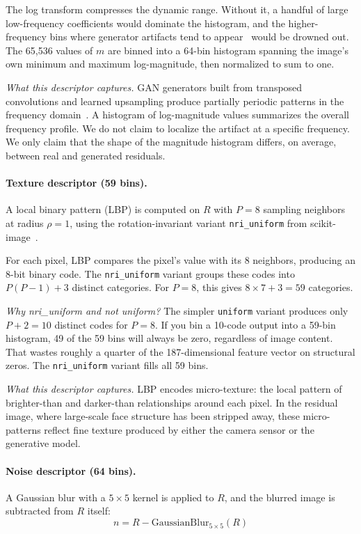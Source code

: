 \documentclass[runningheads]{llncs}
\begin{document}
The log transform compresses the dynamic range. Without it, a handful of large low-frequency coefficients would dominate the histogram, and the higher-frequency bins where generator artifacts tend to appear~\cite{zhang2019} would be drowned out. The 65,536 values of $m$ are binned into a 64-bin histogram spanning the image's own minimum and maximum log-magnitude, then normalized to sum to one.

\textit{What this descriptor captures.} GAN generators built from transposed convolutions and learned upsampling produce partially periodic patterns in the frequency domain~\cite{zhang2019,tan2024}. A histogram of log-magnitude values summarizes the overall frequency profile. We do not claim to localize the artifact at a specific frequency. We only claim that the shape of the magnitude histogram differs, on average, between real and generated residuals.

\paragraph{Texture descriptor (59 bins).} A local binary pattern (LBP) is computed on $R$ with $P = 8$ sampling neighbors at radius $\rho = 1$, using the rotation-invariant variant \texttt{nri\_uniform} from scikit-image~\cite{ojala2002}.

For each pixel, LBP compares the pixel's value with its 8 neighbors, producing an 8-bit binary code. The \texttt{nri\_uniform} variant groups these codes into $P(P-1) + 3$ distinct categories. For $P = 8$, this gives $8 \times 7 + 3 = 59$ categories.

\textit{Why nri\_uniform and not uniform?} The simpler \texttt{uniform} variant produces only $P + 2 = 10$ distinct codes for $P = 8$. If you bin a 10-code output into a 59-bin histogram, 49 of the 59 bins will always be zero, regardless of image content. That wastes roughly a quarter of the 187-dimensional feature vector on structural zeros. The \texttt{nri\_uniform} variant fills all 59 bins.

\textit{What this descriptor captures.} LBP encodes micro-texture: the local pattern of brighter-than and darker-than relationships around each pixel. In the residual image, where large-scale face structure has been stripped away, these micro-patterns reflect fine texture produced by either the camera sensor or the generative model.

\paragraph{Noise descriptor (64 bins).} A Gaussian blur with a $5 \times 5$ kernel is applied to $R$, and the blurred image is subtracted from $R$ itself:
\begin{equation}
n = R - \mathrm{GaussianBlur}_{5 \times 5}(R)
\label{eq:noise}
\end{equation}
\end{document}
